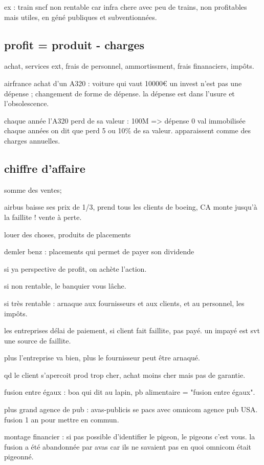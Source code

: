 \documentclass[a4paper,12pt]{article}
\begin{document}
ex : train sncf non rentable car infra chere avec peu de trains, non profitables mais utiles,
en géné publiques et subventionnées.


 

\subsection{profit = produit - charges}



achat, services ext, frais de personnel, ammortissment, frais finanaciers, impôts.


airfrance achat d'un A320 : voiture qui vaut 10000€
un invest n'est pas une dépense ; changement de forme de dépense.
la dépense est dans l'usure et l'obsolescence.

chaque année l'A320 perd de sa valeur : 100M => dépense 0 val immobilisée
chaque années on dit que perd 5 ou 10\% de  sa valeur. apparaissent comme des charges annuelles.


\subsection{chiffre d'affaire}
somme des ventes;

airbus baisse ses prix de 1/3, prend tous les clients de boeing, CA monte jusqu'à la faillite ! vente à perte.

louer des choses,
produits de placements

demler benz : placements qui permet de payer son dividende

si ya perspective de profit, on achète l'action.
 
si non rentable, le banquier vous lâche.

si très rentable : arnaque aux fournisseurs et aux clients, et au personnel, les impôts.

les entreprises délai de paiement, si client fait faillite, pas payé.
un impayé est svt une source de faillite.

plus l'entreprise va bien, plus le fournisseur peut être arnaqué.

qd le client s'apercoit prod trop cher, achat moins cher mais pas de garantie.


fusion entre égaux : boa qui dit au lapin, pb alimentaire = "fusion entre égaux".

plus grand agence de pub : avas-publicis se pacs avec omnicom agence pub USA.
fusion 1 an pour mettre en commun. 

montage financier : si pas possible d'identifier le pigeon, le pigeons c'est vous.
la fusion a été abandonnée par avas car ils ne savaient pas en quoi omnicom était pigeonné.
\end{document}
